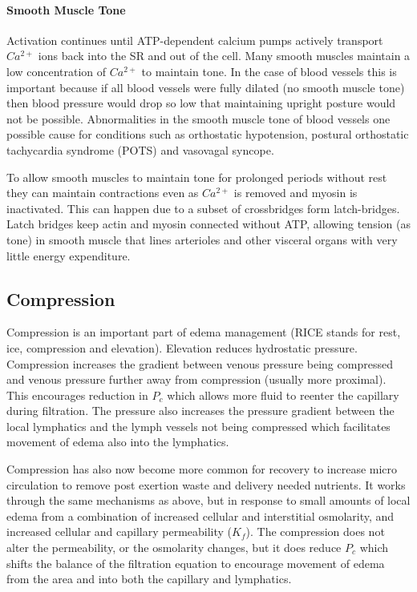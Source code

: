 \paragraph{Smooth Muscle Tone}

Activation continues until ATP-dependent calcium pumps actively transport $Ca^{2+}$  ions back into the SR and out of the cell. Many smooth muscles maintain a low concentration of  $Ca^{2+}$ to maintain tone. In the case of blood vessels this is important because if all blood vessels were fully dilated (no smooth muscle tone) then blood pressure would drop so low that maintaining upright posture would not be possible. Abnormalities in the smooth muscle tone of blood vessels one possible cause for conditions such as orthostatic hypotension, postural orthostatic tachycardia syndrome (POTS) and vasovagal syncope.

To allow smooth muscles to maintain tone for prolonged periods without rest they can maintain contractions even as  $Ca^{2+}$ is removed and myosin is inactivated. This can happen due to a subset of crossbridges form latch-bridges. Latch bridges keep actin and myosin connected without ATP, allowing tension (as tone) in smooth muscle that lines arterioles and other visceral organs with very little energy expenditure.

\subsection{Compression}

Compression is an important part of edema management (RICE stands for rest, ice, compression and elevation). Elevation reduces hydrostatic pressure. Compression increases the gradient between venous pressure being compressed and venous pressure further away from compression (usually more proximal). This encourages reduction in $P_c$ which allows more fluid to reenter the capillary during filtration. The pressure also increases the pressure gradient between the local lymphatics and the lymph vessels not being compressed which facilitates movement of edema also into the lymphatics.

Compression has also now become more common for recovery to increase micro circulation to remove post exertion waste and delivery needed nutrients. It works through the same mechanisms as above, but in response to small amounts of local edema from a combination of increased cellular and interstitial osmolarity, and increased cellular and capillary permeability ($K_f$). The compression does not alter the permeability, or the osmolarity changes, but it does reduce $P_c$ which shifts the balance of the filtration equation to encourage movement of edema from the area and into both the capillary and lymphatics.

